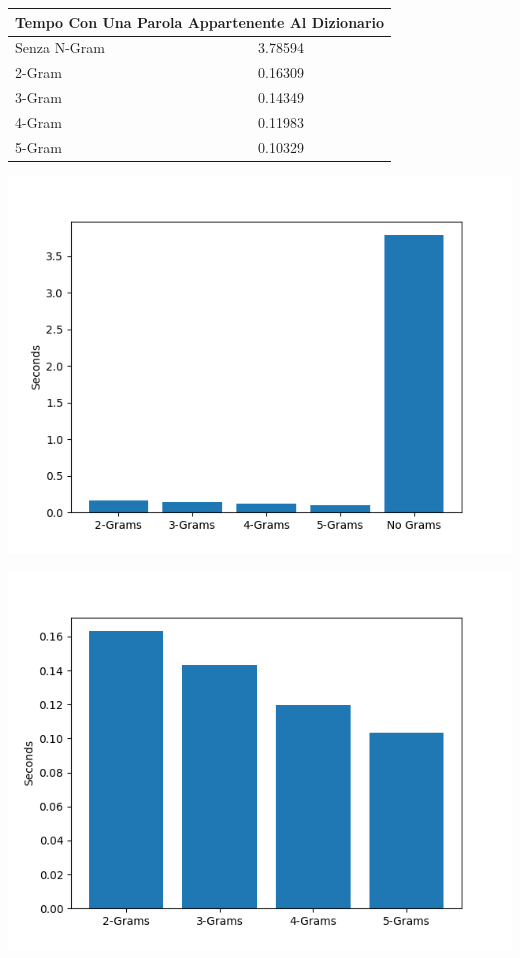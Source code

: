 \documentclass{article}
\begin{document}
\begin{tabular}{ |p{3cm}||p{3.5cm}|  }
 \hline
 \multicolumn{2}{|c|}{Tempo Con Una Parola Appartenente Al Dizionario} \\
\hline
 Senza N-Gram  &   3.78594\\\hline
 2-Gram &  0.16309    \\\hline
 3-Gram & 0.14349 \\\hline
 4-Gram & 0.11983\\\hline
 5-Gram & 0.10329  \\
 \hline
\end{tabular}

\includegraphics[scale=0.5]{img/ParolaNonModificata_60000_parole.png}

\includegraphics[scale=0.5]{img/ParolaNonModificataSoloGram_60000_parole.png}
\end{document}
